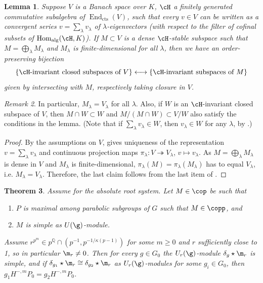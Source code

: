 \documentclass[a4paper]{amsart}
\numberwithin{equation}{section}
\newtheorem{thm}{Theorem}[section]
\newtheorem{lem}[thm]{Lemma}
\theoremstyle{remark}
\newtheorem{remark}[thm]{Remark}
\theoremstyle{definition}
\DeclareMathOperator{\Hom}{Hom}
\DeclareMathOperator{\End}{End}
\newcommand{\Q}{\mathbb{Q}}
\newcommand{\onto}{\twoheadrightarrow}
\begin{document}
\begin{lem}\label{lm:feaux}
  Suppose $V$ is a Banach space over $K$, $\cH$ a finitely generated commutative subalgebra of $\End_{\mathrm{cts}}(V)$,
  such that every $v \in V$ can be written as a convergent series $v = \sum_{\lambda} v_\lambda$ of $\lambda$-eigenvectors
  (with respect to the filter of cofinal subsets of $\Hom_{\mathrm{alg}}(\cH,K)$).
  If $M \subset V$ is a dense $\cH$-stable subspace such that $M = \bigoplus_\lambda M_\lambda$ and $M_\lambda$ is finite-dimensional for all $\lambda$,
  then we have an order-preserving bijection
  \begin{equation*}
    \{ \text{$\cH$-invariant closed subspaces of $V$} \} \longleftrightarrow \{ \text{$\cH$-invariant subspaces of $M$} \}
  \end{equation*}
  given by intersecting with $M$, respectively taking closure in $V$.
\end{lem}

\begin{remark}\label{rk:feaux}
  In particular, $M_\lambda = V_\lambda$ for all $\lambda$. Also, if $W$ is an $\cH$-invariant closed subspace of
  $V$, then $M \cap W \subset W$ and $M/(M \cap W) \subset V/W$ also satisfy the conditions in the lemma.
  (Note that if $\sum_\lambda v_\lambda \in W$, then $v_\lambda \in W$ for any $\lambda$, by \cite[Kor.\ 1.3.8]{feaux-diss}.)
\end{remark}

\begin{proof}
  By the assumptions on $V$, \cite[Kor.\ 1.3.12]{feaux-diss} gives uniqueness of the representation $v = \sum_\lambda v_\lambda$ and
  continuous projection maps $\pi_\lambda : V \onto V_\lambda$, $v \mapsto v_\lambda$. As $M = \bigoplus_\lambda M_\lambda$ is dense in $V$ and
  $M_\lambda$ is finite-dimensional, $\pi_\lambda(M) = \pi_\lambda(M_\lambda)$ has to equal $V_\lambda$, i.e. $M_\lambda = V_\lambda$.
  Therefore, the last claim follows from the last item of \cite[Kor.\ 1.3.12]{feaux-diss}.
\end{proof}

\begin{thm}\label{thm:OS-4.7}
  Assume \cite[Assumption 4.1]{OS3} for the absolute root system. Let $M \in \cop$ be such that 
  \begin{enumerate}
  \item $P$ is maximal among parabolic subgroups of $G$ such that $M \in \copp$, and
  \item $M$ is simple as $U(\g)$-module.
  \end{enumerate}
  Assume $r^{p^m} \in p^{\Q} \cap (p^{-1},p^{-1/\kappa(p-1)})$ for some $m \ge 0$ and $r$ sufficiently close to 1, so in particular $\m_r \ne 0$.
  Then for every $g \in G_0$ the $U_r(\g)$-module $\delta_g \star \m_r$ is simple, and if $\delta_{g_1} \star \m_r \cong \delta_{g_2} \star \m_r$
  as $U_r(\g)$-modules for some $g_i \in G_0$, then $g_1 H^{-,m} P_0 = g_2 H^{-,m} P_0$.
\end{thm}
\end{document}
